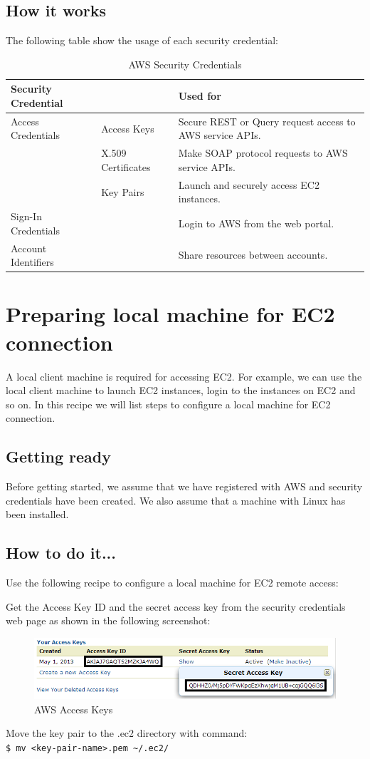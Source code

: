 \subsection*{How it works}
The following table show the usage of each security credential:
\begin{table}[ht]
  \footnotesize
  \centering
  \begin{tabular}{lll}
    \toprule
    \textbf{Security Credential} & & \textbf{Used for} \\ \midrule
    Access Credentials & Access Keys & Secure REST or Query request access to AWS service APIs. \\
    & X.509 Certificates & Make SOAP protocol requests to AWS service APIs. \\
    & Key Pairs & Launch and securely access EC2 instances. \\
    Sign-In Credentials  & & Login to AWS from the web portal. \\
    Account Identifiers  & & Share resources between accounts. \\ \bottomrule
  \end{tabular}
  \caption{AWS Security Credentials}\label{tbl:awssecurity}
\end{table}

\section{Preparing local machine for EC2 connection}
A local client machine is required for accessing EC2. For example, we can use the local client machine to launch EC2 instances, login to the instances on EC2 and so on. In this recipe we will list steps to configure a local machine for EC2 connection.
\subsection*{Getting ready}
Before getting started, we assume that we have registered with AWS and security credentials have been created. We also assume that a machine with Linux has been installed.
\subsection*{How to do it...}
Use the following recipe to configure a local machine for EC2 remote access:

Get the Access Key ID and the secret access key from the security credentials web page as shown in the following screenshot:
\begin{figure}[ht]
  \centering
  \includegraphics[width=.8\textwidth]{figs/5163os_08_15.png}
  \caption{AWS Access Keys}\label{fig:aws.access.keys}
\end{figure} 
Move the key pair to the .ec2 directory with command: \\
\verb|$ mv <key-pair-name>.pem ~/.ec2/|


